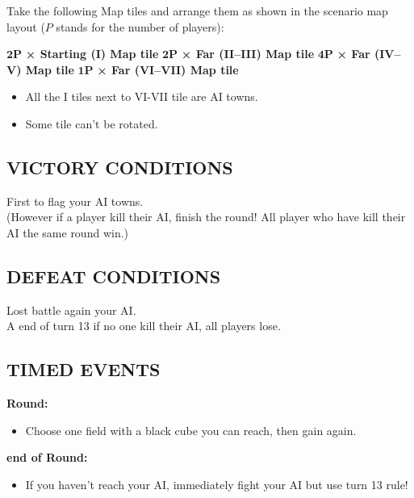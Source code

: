 \begin{multicols*}{2}
Take the following Map tiles and arrange them as shown in the scenario map layout ($P$ stands for the number of players):

$\boldsymbol{2 P}$ \textbf{× Starting (I) Map tile}
$\boldsymbol{2 P}$ \textbf{× Far (II--III) Map tile}
$\boldsymbol{4 P}$ \textbf{× Far (IV--V) Map tile}
$\boldsymbol{1 P}$ \textbf{× Far (VI--VII) Map tile}
\begin{itemize}
    \item All the I tiles next to VI-VII tile are AI towns.
    \item Some tile can't be rotated.
\end{itemize}

\subsection*{\MakeUppercase{Victory Conditions}}

First to flag your AI towns.\\
(However if a player kill their AI, finish the round! All player who have kill their AI the same round win.)

\subsection*{\MakeUppercase{Defeat Conditions}}

Lost battle again your AI.\\
A end of turn 13 if no one kill their AI, all players lose.

\subsection*{\MakeUppercase{Timed Events}}

\textbf{ Round:}
\begin{itemize}
  \item Choose one field with a black cube you can reach, then gain again.
\end{itemize}
\textbf{end of  Round:}
\begin{itemize}
    \item If you haven't reach your AI, immediately fight your AI but use turn 13 rule!
\end{itemize}


\end{multicols*}
